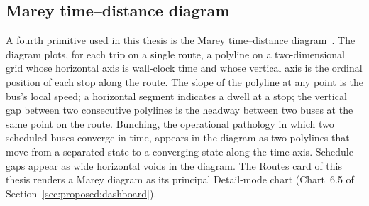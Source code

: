 \subsection{Marey time--distance diagram}
\label{sec:background:marey}

A fourth primitive used in this thesis is the Marey time--distance
diagram~\cite{linzeng2014}. The diagram plots, for each trip on a
single route, a polyline on a two-dimensional grid whose
horizontal axis is wall-clock time and whose vertical axis is the
ordinal position of each stop along the route. The slope of the
polyline at any point is the bus's local speed; a horizontal
segment indicates a dwell at a stop; the vertical gap between
two consecutive polylines is the headway between two buses at
the same point on the route. Bunching, the operational pathology
in which two scheduled buses converge in time, appears in the
diagram as two polylines that move from a separated state to a
converging state along the time axis. Schedule gaps appear as
wide horizontal voids in the diagram. The Routes card of this
thesis renders a Marey diagram as its principal Detail-mode chart
(Chart~6.5 of Section~\ref{sec:proposed:dashboard}).
